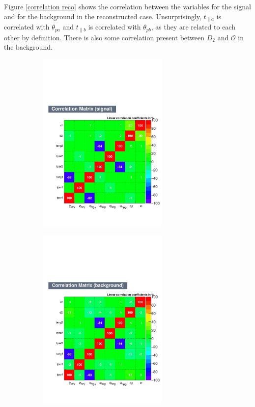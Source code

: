 \documentclass[10pt,a4paper]{book}
\begin{document}
Figure \ref{correlation reco} shows the correlation between the variables for the signal and for the background in the reconstructed case. Unsurprisingly, $t_{\parallel a}$ is correlated with $\theta_{pa}$ and $t_{\parallel b}$ is correlated with $\theta_{pb}$, as they are related to each other by definition. There is also some correlation present between $D_2$ and $\mathcal{O}$ in the background. 

\begin{figure}[h]
\begin{subfigure}{1.0\textwidth}
\centering
\includegraphics[width=0.7\textwidth]{ch4_images/CorrelationMatrixS_reco.pdf}
\caption{}
\end{subfigure}
\begin{subfigure}{1.0\textwidth}
\centering
\includegraphics[width=0.7\textwidth]{ch4_images/CorrelationMatrixB_reco.pdf}

\end{subfigure}
\end{figure}
\end{document}
